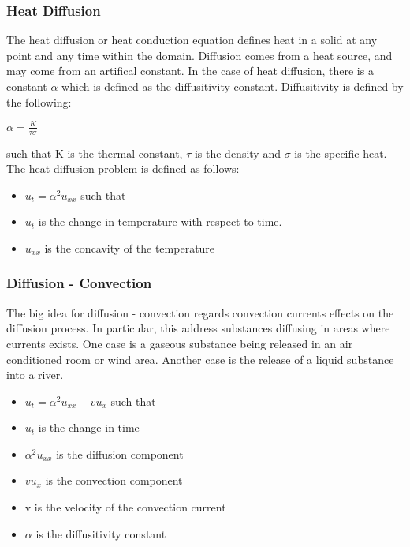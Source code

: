 \documentclass[11pt]{article}
\begin{document}
\subsubsection {Heat Diffusion}

The heat diffusion or heat conduction equation defines heat in a solid at any point and any time within the domain.  Diffusion comes from a heat source, and may come from an artifical constant.  In the case of heat diffusion, there is a constant $\alpha$ which is defined as the diffusitivity constant.  Diffusitivity is defined by the following:

$\alpha = \frac{K}{\tau \sigma} $ 

such that K is the thermal constant, $\tau$ is the density and $\sigma$ is the specific heat.  The heat diffusion problem is defined as follows:


\begin{itemize}
\item $u_t = \alpha ^2 u_{xx} $ such that
\item $u_t$ is the change in temperature with respect to time.
\item $u_{xx}$ is the concavity of the temperature
\end{itemize}

\subsubsection {Diffusion - Convection }
The big idea for diffusion - convection regards convection currents effects on the diffusion process.  In particular, this address substances diffusing in areas where currents exists.  One case is a gaseous substance being released in an air conditioned room or wind area.  Another case is the release of a liquid substance into a river.



\begin{itemize}
\item $u_t = \alpha ^2 u_{xx} - vu_x $ such that
\item $u_t $ is the change in time
\item $\alpha ^2 u_{xx} $ is the diffusion component
\item $vu_x$ is the convection component
\item v is the velocity of the convection current
\item $\alpha$ is the diffusitivity constant
\end{itemize}
\end{document}
